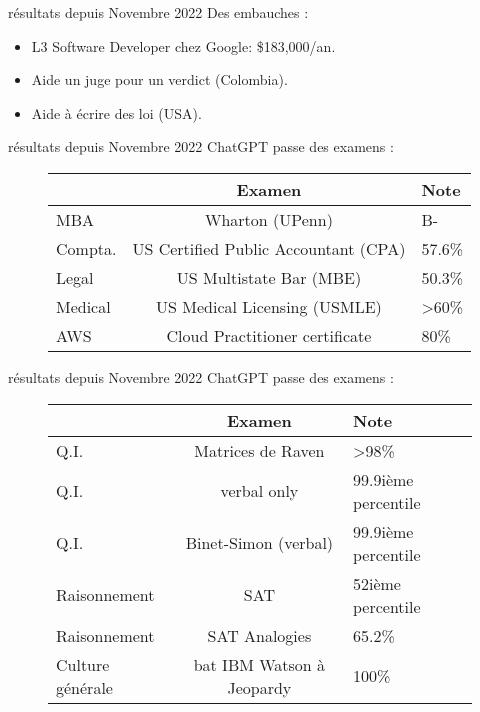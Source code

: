 \begin{frame}{résultats depuis Novembre 2022}
  Des embauches :
  \begin{itemize}
    \item L3 Software Developer chez Google: \$183,000/an.
    \item Aide un juge pour un verdict (Colombia).
    \item Aide à écrire des loi (USA).
  \end{itemize}
\end{frame}

\begin{frame}{résultats depuis Novembre 2022}
  ChatGPT passe des examens :
  \begin{figure}
    \centering
    \begin{tabular}{lcl}
      \toprule
              & Examen                               & Note  \\
      \midrule
      MBA     & Wharton (UPenn)                       & B-  \\
      Compta. & US Certified Public Accountant (CPA)  & 57.6\% \\
      Legal   & US Multistate Bar (MBE)               & 50.3\% \\
      Medical & US Medical Licensing (USMLE)          & >60\% \\
      AWS     & Cloud Practitioner certificate        & 80\% \\
      \bottomrule
    \end{tabular}
  \end{figure}

\end{frame}

\begin{frame}{résultats depuis Novembre 2022}
  ChatGPT passe des examens :
  \begin{figure}
    \centering
    \begin{tabular}{lcl}
      \toprule
              & Examen                               & Note  \\
      \midrule
      Q.I. & Matrices de Raven &	>98\% \\
      Q.I. & verbal only & 99.9ième percentile \\
      Q.I. & Binet-Simon (verbal) & 99.9ième percentile \\
      Raisonnement &  SAT & 52ième percentile \\
      Raisonnement & SAT Analogies &	65.2\% \\
      Culture générale & bat IBM Watson à Jeopardy\! &	100\% \\
      \bottomrule
    \end{tabular}
  \end{figure}
\end{frame}

